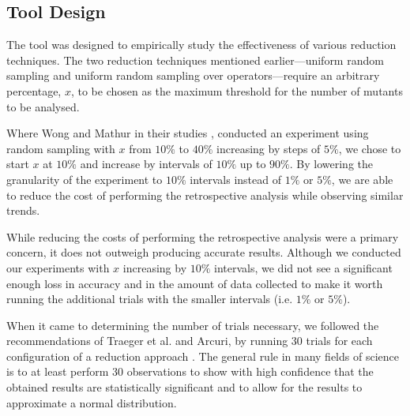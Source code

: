 \subsection{Tool Design}

The \mr tool was designed to empirically study the effectiveness of
various reduction techniques. The two reduction techniques mentioned earlier---uniform random sampling
and uniform random sampling over operators---require an arbitrary percentage, $x$, to be chosen as the maximum threshold
for the number of mutants to be analysed.

Where Wong and Mathur in their studies \cite{mathur1994empirical}, \cite{wong1993mutation} conducted
an experiment using random sampling with $x$ from $10\%$ to $40\%$ increasing by steps of $5\%$, we
chose to start $x$ at $10\%$ and increase by intervals of $10\%$ up to $90\%$. By lowering
the granularity of the experiment to $10\%$ intervals instead of
$1\%$ or $5\%$, we are able to reduce the cost of performing the retrospective analysis while observing
similar trends.

While reducing the costs of performing the retrospective analysis were a primary concern, it does not
outweigh producing accurate results. Although we conducted our experiments with $x$ increasing by
$10\%$ intervals, we did not see a significant enough loss in accuracy and in the amount of data collected to make
it worth running the additional trials with the smaller intervals (i.e. $1\%$ or $5\%$).

When it came to determining the number of trials necessary, we followed
the recommendations of Traeger et al. and Arcuri, by running 30 trials for each configuration of a reduction approach \cite{traeger2008nine, arcuri2014hitchhiker}.
The general rule in many fields of science is to at least perform 30 observations to show with high confidence
that the obtained results are statistically significant and to allow for the results to approximate a normal
distribution.


